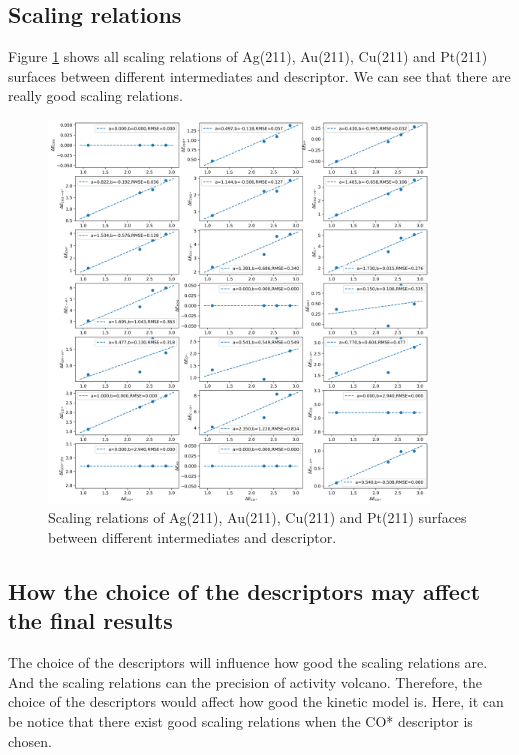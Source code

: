 \documentclass{article}
\begin{document}
    \subsection*{Scaling relations}
    Figure \ref{fig:Scaling_relation} shows all scaling relations of Ag(211), Au(211), Cu(211) and Pt(211) surfaces between different intermediates and descriptor. We can see that there are really good scaling relations.
    \FloatBarrier
    \begin{figure}[!ht]
        \centering
        \includegraphics[width=0.9\textwidth]{Pictures/Scaling_relation.png}
        \caption{Scaling relations of Ag(211), Au(211), Cu(211) and Pt(211) surfaces between different intermediates and descriptor.}
        \label{fig:Scaling_relation}
    \end{figure}

    
    \subsection*{How the choice of the descriptors may affect the final results}
    The choice of the descriptors will influence how good the scaling relations are. And the scaling relations can the precision of activity volcano. Therefore, the choice of the descriptors would affect how good the kinetic model is. Here, it can be notice that there exist good scaling relations when the CO* descriptor is chosen.
    
\end{document}
